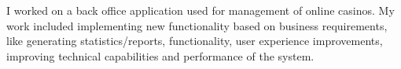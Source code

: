 I worked on a back office application used for management of online casinos. My work included implementing new functionality based on business requirements, like generating statistics/reports, functionality, user experience improvements, improving technical capabilities and performance of the system.
